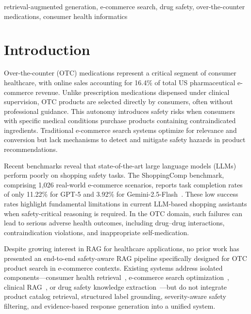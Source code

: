 \documentclass[conference]{IEEEtran}
\begin{document}
\begin{IEEEkeywords}
retrieval-augmented generation, e-commerce search, drug safety,
over-the-counter medications, consumer health informatics
\end{IEEEkeywords}

\section{Introduction}

Over-the-counter (OTC) medications represent a critical segment of consumer
healthcare, with online sales accounting for 16.4\% of total US pharmaceutical
e-commerce revenue. Unlike prescription medications dispensed under clinical
supervision, OTC products are selected directly by consumers, often without
professional guidance. This autonomy introduces safety risks when consumers
with specific medical conditions purchase products containing contraindicated
ingredients. Traditional e-commerce search systems optimize for relevance and
conversion but lack mechanisms to detect and mitigate safety hazards in product
recommendations.

Recent benchmarks reveal that state-of-the-art large language models (LLMs)
perform poorly on shopping safety tasks. The ShoppingComp benchmark, comprising
1,026 real-world e-commerce scenarios, reports task completion rates of only
11.22\% for GPT-5 and 3.92\% for Gemini-2.5-Flash~\cite{shoppingcomp}. These
low success rates highlight fundamental limitations in current LLM-based
shopping assistants when safety-critical reasoning is required. In the OTC
domain, such failures can lead to serious adverse health outcomes, including
drug--drug interactions, contraindication violations, and inappropriate
self-medication.

Despite growing interest in RAG for healthcare applications, no prior work has
presented an end-to-end safety-aware RAG pipeline specifically designed for OTC
product search in e-commerce contexts. Existing systems address isolated
components---consumer health retrieval~\cite{medagent}, e-commerce search
optimization~\cite{shoppingcomp,sia}, clinical RAG~\cite{toolcalling,pgxrag},
or drug safety knowledge extraction~\cite{sidekick,splextraction}---but do not
integrate product catalog retrieval, structured label grounding, severity-aware
safety filtering, and evidence-based response generation into a unified system.
\end{document}
